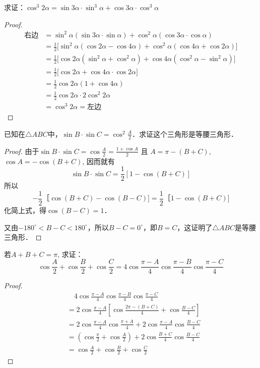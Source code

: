 \begin{example}
求证：$\cos^3 2\alpha= \sin 3\alpha\cdot \sin^3\alpha+\cos 3\alpha\cdot \cos^3\alpha$
\end{example}

\begin{proof}
\[\begin{split}
\text{右边}&=\sin^2\alpha(\sin3\alpha\cdot \sin\alpha)+\cos^2\alpha(\cos3\alpha\cdot\cos\alpha)\\
&=\frac{1}{2}\big[\sin^2\alpha(\cos2\alpha-\cos4\alpha)+\cos^2\alpha(\cos4\alpha+\cos2\alpha)\big]\\
&=\frac{1}{2}\big[\cos 2\alpha(\sin^2\alpha+\cos^2\alpha)+\cos4\alpha(\cos^2\alpha-\sin^2\alpha)\big]\\
&=\frac{1}{2}\big[\cos2\alpha+\cos4\alpha\cdot\cos2\alpha\big]\\
&=\frac{1}{2}\cos2\alpha(1+\cos4\alpha)\\
&=\frac{1}{2}\cos2\alpha\cdot 2\cos^2 2\alpha\\
&=\cos^3 2\alpha=\text{左边}
\end{split}\]
\end{proof}

    

\begin{example}
    已知在$\triangle ABC$中，$\sin B\cdot \sin C=\cos^2\frac{A}{2}$．求证这个三角形是等腰三角形．
\end{example}


\begin{proof}
由于$\sin B\cdot \sin C=\cos\frac{A}{2}=\frac{1+\cos A}{2}$
且 $A=\pi-(B+C)$, $\cos A=-\cos(B+C)$, 因而就有
\[\sin B\cdot \sin C =\frac{1}{2} [1-\cos (B+C) ] \]
所以
\[-\frac{1}{2}［\cos (B+C) -\cos (B-C) ]
=\frac{1}{2}［1-\cos (B+C)]\]
化简上式，得$\cos (B-C) =1$．

又由$-180^{\circ}<B-C<180^{\circ}$，所以$B-C=0^{\circ}$，即$B=C$，这证明了$\triangle ABC$是等腰三角形．    
\end{proof}


\begin{example}
若$A+B+C=\pi$, 求证：
$$\cos\frac{A}{2}+\cos \frac{B}{2}+\cos \frac{C}{2}=4\cos\frac{\pi-A}{4}\cos\frac{\pi-B}{4}\cos\frac{\pi-C}{4}$$  
\end{example}

\begin{proof}
\[\begin{split}
&\quad  4\cos\frac{\pi-A}{4}\cos\frac{\pi-B}{4}\cos\frac{\pi-C}{4}\\
&= 2\cos\frac{\pi-A}{4}\left[\cos\frac{2\pi-(B+C)}{4}+\cos\frac{B-C}{4}\right]\\
&= 2\cos\frac{\pi-A}{4}  \cos\frac{\pi+A}{4} +2\cos\frac{\pi-A}{4} \cos\frac{B-C}{4} \\
&=\left(\cos\frac{\pi}{2}+\cos\frac{A}{2}\right)+2\cos\frac{B+C}{4}\cos\frac{B-C}{4}   \\
&=\cos\frac{A}{2}+\cos \frac{B}{2}+\cos \frac{C}{2}
\end{split}\] 
\end{proof}


